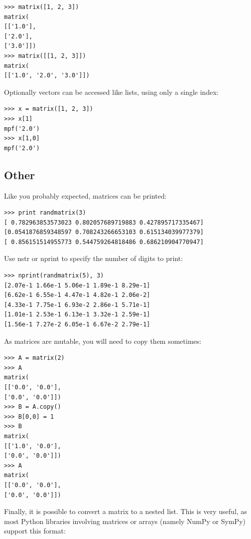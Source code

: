 \begin{lstlisting}
>>> matrix([1, 2, 3])
matrix(
[['1.0'],
['2.0'],
['3.0']])
>>> matrix([[1, 2, 3]])
matrix(
[['1.0', '2.0', '3.0']])
\end{lstlisting}

Optionally vectors can be accessed like lists, using only a single index:

\begin{lstlisting}
>>> x = matrix([1, 2, 3])
>>> x[1]
mpf('2.0')
>>> x[1,0]
mpf('2.0')
\end{lstlisting}







\subsection{Other}

Like you probably expected, matrices can be printed:

\begin{lstlisting}
>>> print randmatrix(3)
[ 0.782963853573023 0.802057689719883 0.427895717335467]
[0.0541876859348597 0.708243266653103 0.615134039977379]
[ 0.856151514955773 0.544759264818486 0.686210904770947]
\end{lstlisting}

Use nstr or nprint to specify the number of digits to print:

\begin{lstlisting}
>>> nprint(randmatrix(5), 3)
[2.07e-1 1.66e-1 5.06e-1 1.89e-1 8.29e-1]
[6.62e-1 6.55e-1 4.47e-1 4.82e-1 2.06e-2]
[4.33e-1 7.75e-1 6.93e-2 2.86e-1 5.71e-1]
[1.01e-1 2.53e-1 6.13e-1 3.32e-1 2.59e-1]
[1.56e-1 7.27e-2 6.05e-1 6.67e-2 2.79e-1]
\end{lstlisting}

As matrices are mutable, you will need to copy them sometimes:

\begin{lstlisting}
>>> A = matrix(2)
>>> A
matrix(
[['0.0', '0.0'],
['0.0', '0.0']])
>>> B = A.copy()
>>> B[0,0] = 1
>>> B
matrix(
[['1.0', '0.0'],
['0.0', '0.0']])
>>> A
matrix(
[['0.0', '0.0'],
['0.0', '0.0']])
\end{lstlisting}

Finally, it is possible to convert a matrix to a nested list. This is very useful, as most Python libraries involving matrices or arrays (namely NumPy or SymPy) support this format:

